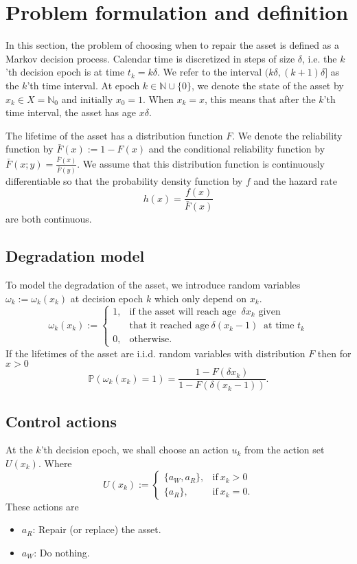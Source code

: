 \section{Problem formulation and definition}\label{section:AgeBasedDefinition}
In this section, the problem of choosing when to repair the asset is defined as a Markov decision process.
Calendar time is discretized in steps of size $\delta$, i.e. the $k$'th decision epoch is at time $t_k=k\delta$.
We refer to the interval $(k\delta,(k+1)\delta]$ as the $k$'th time interval.
At epoch $k\in\mathbb{N}\cup\{0\}$, we denote the state of the asset by $x_k\in X=\mathbb{N}_0$ and initially $x_0=1$.
When $x_k=x$, this means that after the $k$'th time interval, the asset has age $x\delta$.

The lifetime of the asset has a distribution function $F$.
We denote the reliability function by $\bar F(x):=1-F(x)$ and the conditional reliability function by $\bar F(x;y)=\frac{\bar F(x)}{\bar F(y)}$.
We assume that this distribution function is continuously differentiable so that the probability density function by $f$ and the hazard rate 
\[
h(x)=\frac{f(x)}{\bar F(x)}
\] 
are both continuous.

\subsection{Degradation model}
To model the degradation of the asset, we introduce random variables $\omega_k:=\omega_k(x_k)$ at decision epoch $k$ which only depend on $x_k$.
$$
\omega_k(x_k):=\begin{cases}
1,&\text{if the asset will reach age }\ \delta x_{k}\text{ given}\\
&\text{that it reached age}\ \delta(x_k-1)\ \text{ at time } t_k \\
0,&\text{otherwise}.
\end{cases}
$$
If the lifetimes of the asset are i.i.d. random variables with distribution $F$ then for $x>0$
$$
\mathbb{P}(\omega_k(x_k)=1)=\frac{1-F(\delta x_k)}{1-F(\delta (x_k-1))}.
$$

\subsection{Control actions}
At the $k$'th decision epoch, we shall choose an action $u_k$ from the action set $U(x_k)$.
Where
$$
U(x_k):=\begin{cases}
\{a_W,a_R\},&\text{if}\ x_k>0 \\
\{a_R\},&\text{if}\ x_k=0.
\end{cases}
$$
These actions are
\begin{itemize}
	\item $a_R$:
	Repair (or replace) the asset.
	\item $a_W$:
	Do nothing.
\end{itemize}

